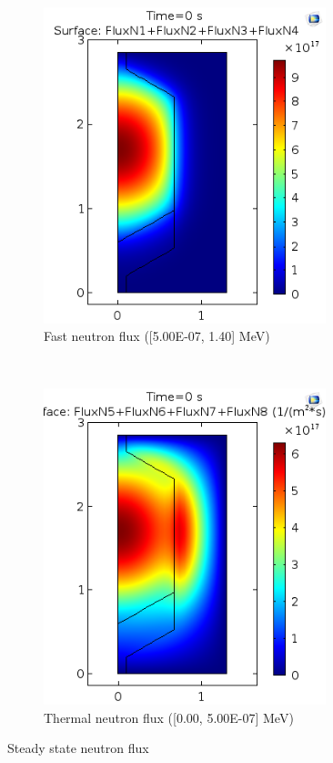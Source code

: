 \documentclass{elsarticle}
\begin{document}
\begin{figure}
  \centering
  \begin{subfigure}[b]{0.46\textwidth}
        \centering
        \includegraphics[width=0.9\textwidth]{./images/diffusion/tmsr/SS/non_ms/fast_flux.png}
        \caption{Fast neutron flux ([5.00E-07, 1.40] MeV)}
    \end{subfigure}%
    ~
    \begin{subfigure}[b]{0.46\textwidth}
        \centering
        \includegraphics[width=0.9\textwidth]{./images/diffusion/tmsr/SS/non_ms/thermal_flux.png}
        \caption{Thermal neutron flux ([0.00, 5.00E-07] MeV)}
    \end{subfigure}
    \caption{Steady state neutron flux}
    \label{fig:ss_res_flux}
\end{figure}
\end{document}

